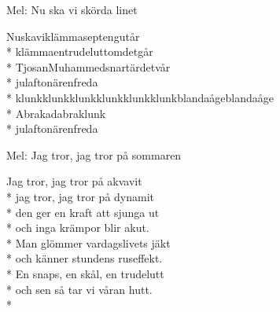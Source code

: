\begin{SongText}[Nuskaviklämmasepten]
    \begin{SongInfo}
        Mel: Nu ska vi skörda linet
    \end{SongInfo}
    \begin{SongVerse}
        Nuskaviklämmaseptengutår\\*%
        klämmaentrudeluttomdetgår\\*%
        TjosanMuhammedsnartärdetvår\\*%
        julaftonärenfreda\\*%
        klunkklunkklunkklunkklunkklunkblandaågeblandaåge\\*%
        Abrakadabraklunk\\*%
        julaftonärenfreda
    \end{SongVerse}
\end{SongText}
\begin{SongText}
    \begin{SongInfo}
        Mel: Jag tror, jag tror på sommaren
    \end{SongInfo}
    \begin{SongVerse}
        Jag tror, jag tror på akvavit\\*%
        jag tror, jag tror på dynamit\\*%
        den ger en kraft att sjunga ut\\*%
        och inga krämpor blir akut.\\*%
        Man glömmer vardagslivets jäkt\\*%
        och känner stundens ruseffekt.\\*%
        En snaps, en skål, en trudelutt\\*%
        och sen så tar vi våran hutt.\\*%
    \end{SongVerse}
\end{SongText}
\newpage
